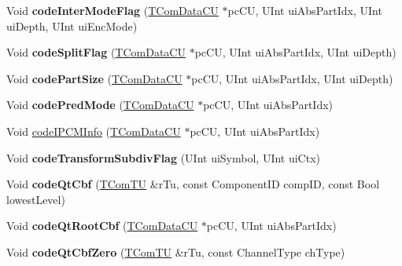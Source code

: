\begin{DoxyCompactItemize}
Void {\bfseries code\+Inter\+Mode\+Flag} (\hyperlink{class_t_com_data_c_u}{T\+Com\+Data\+CU} $\ast$pc\+CU, U\+Int ui\+Abs\+Part\+Idx, U\+Int ui\+Depth, U\+Int ui\+Enc\+Mode)
\item 
\mbox{\label{class_t_enc_cavlc_a925a23acb912d8eb68a8f77907cc6b78}} 
Void {\bfseries code\+Split\+Flag} (\hyperlink{class_t_com_data_c_u}{T\+Com\+Data\+CU} $\ast$pc\+CU, U\+Int ui\+Abs\+Part\+Idx, U\+Int ui\+Depth)
\item 
\mbox{\label{class_t_enc_cavlc_a6703c1b8fd5bfe54122570a860d8f3fb}} 
Void {\bfseries code\+Part\+Size} (\hyperlink{class_t_com_data_c_u}{T\+Com\+Data\+CU} $\ast$pc\+CU, U\+Int ui\+Abs\+Part\+Idx, U\+Int ui\+Depth)
\item 
\mbox{\label{class_t_enc_cavlc_aa989b59423d328bc04b81b4be7a0b24e}} 
Void {\bfseries code\+Pred\+Mode} (\hyperlink{class_t_com_data_c_u}{T\+Com\+Data\+CU} $\ast$pc\+CU, U\+Int ui\+Abs\+Part\+Idx)
\item 
Void \hyperlink{class_t_enc_cavlc_a9e19f3ef8ce0af73f4c0edb681818db0}{code\+I\+P\+C\+M\+Info} (\hyperlink{class_t_com_data_c_u}{T\+Com\+Data\+CU} $\ast$pc\+CU, U\+Int ui\+Abs\+Part\+Idx)
\item 
\mbox{\label{class_t_enc_cavlc_a59b389c7eccac1001f00a35956218541}} 
Void {\bfseries code\+Transform\+Subdiv\+Flag} (U\+Int ui\+Symbol, U\+Int ui\+Ctx)
\item 
\mbox{\label{class_t_enc_cavlc_a25059fb31ba4db85d0874772a494622b}} 
Void {\bfseries code\+Qt\+Cbf} (\hyperlink{class_t_com_t_u}{T\+Com\+TU} \&r\+Tu, const Component\+ID comp\+ID, const Bool lowest\+Level)
\item 
\mbox{\label{class_t_enc_cavlc_a2bbcbc7d46f05b318d5f4a00db189c55}} 
Void {\bfseries code\+Qt\+Root\+Cbf} (\hyperlink{class_t_com_data_c_u}{T\+Com\+Data\+CU} $\ast$pc\+CU, U\+Int ui\+Abs\+Part\+Idx)
\item 
\mbox{\label{class_t_enc_cavlc_a9248c44c828bc43662da5037af1a9b3e}} 
Void {\bfseries code\+Qt\+Cbf\+Zero} (\hyperlink{class_t_com_t_u}{T\+Com\+TU} \&r\+Tu, const Channel\+Type ch\+Type)
\item 
\mbox{\label{class_t_enc_cavlc_a67bee22acbb357f6bf7f0b52b1c12d75}} 

\end{DoxyCompactItemize}
